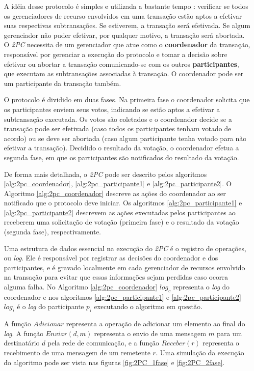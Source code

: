 \documentclass[11pt,twoside,a4paper]{book}
\begin{document}
A idéia desse protocolo é simples e utilizada a bastante tempo \cite{2pc}:
verificar se todos os gerenciadores de recurso envolvidos em uma transação estão aptos a efetivar suas respectivas subtransações. Se estiverem, a 
transação será efetivada. Se algum gerenciador não puder efetivar, por qualquer motivo, a transação será abortada. O \emph{2PC} necessita de um 
gerenciador que atue como o \textbf{coordenador} da transação, responsável por gerenciar a execução do protocolo e tomar a decisão sobre efetivar 
ou abortar a transação comunicando-se com os outros \textbf{participantes}, que executam as subtransações associadas à transação. O coordenador 
pode ser um participante da transação também.

O protocolo é dividido em duas fases. Na primeira fase o coordenador solicita que os participantes enviem seus votos, indicando se estão aptos a 
efetivar a subtransação executada. Os votos são coletados e o coordenador decide se a transação pode ser efetivada (caso todos os participantes 
tenham votado de acordo) ou se deve ser abortada (caso algum participante tenha votado para não efetivar a transação). Decidido o resultado da 
votação, o coordenador efetua a segunda fase, em que os participantes são notificados do resultado da votação. 

De forma mais detalhada, o \emph{2PC} pode ser descrito pelos algoritmos \ref{alg:2pc_coordenador}, \ref{alg:2pc_participante1} e 
\ref{alg:2pc_participante2}. O Algoritmo \ref{alg:2pc_coordenador} descreve as ações do coordenador ao ser notificado que o protocolo deve 
iniciar. Os algoritmos \ref{alg:2pc_participante1} e \ref{alg:2pc_participante2} descrevem as ações executadas pelos participantes ao receberem 
uma solicitação de votação (primeira fase) e o resultado da votação (segunda fase), respectivamente. 

Uma estrutura de dados essencial na execução do \emph{2PC} é o registro de operações, ou \emph{log}. Ele é responsável por registrar as decisões 
do coordenador e dos participantes, e é gravado localmente em cada gerenciador de recursos envolvido na transação para evitar que essas 
informações sejam perdidas caso ocorra alguma falha. No Algoritmo \ref{alg:2pc_coordenador} $log_c$ representa o \emph{log} do coordenador e nos 
algoritmos \ref{alg:2pc_participante1} e \ref{alg:2pc_participante2} $log_i$ é o \emph{log} do participante $p_i$ executando o algoritmo em 
questão.

A função $Adicionar$ representa a operação de adicionar um elemento ao final do
\emph{log}. A função $Enviar(d, m)$ representa o envio de uma mensagem $m$ para
um destinatário $d$ pela rede de comunicação, e a função $Receber(r)$ representa
o recebimento de uma mensagem de um remetente $r$. Uma simulação da execução do
algoritmo pode ser vista nas figuras \ref{fig:2PC_1fase} e \ref{fig:2PC_2fase}.
\end{document}
